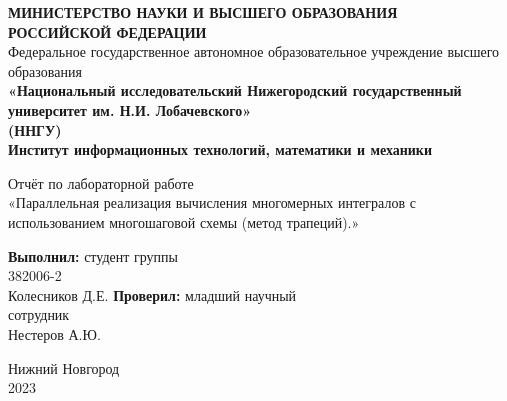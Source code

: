\documentclass[14pt, a4paper]{extarticle}
\title{}
\author{}
\date{}
\begin{document}
\begin{titlepage}
\begin{center}
{\bfseries МИНИСТЕРСТВО НАУКИ И ВЫСШЕГО ОБРАЗОВАНИЯ \\
РОССИЙСКОЙ ФЕДЕРАЦИИ}
\\
Федеральное государственное автономное образовательное учреждение высшего образования
\\
{\bfseries «Национальный исследовательский Нижегородский государственный университет им. Н.И. Лобачевского»\\(ННГУ)
\\Институт информационных технологий, математики и механики} \\
\end{center}

\vspace{8em}

\begin{center}
Отчёт по лабораторной работе \\
«Параллельная реализация вычисления многомерных интегралов с использованием многошаговой схемы (метод трапеций).»
\end{center}

\vspace{5em}


\begin{flushright}
{\bfseries Выполнил:} студент группы\\382006-2\\Колесников Д.Е. \underline{\hspace{3cm}} \linebreak\linebreak\linebreak
{\bfseries Проверил:} младший научный\\сотрудник\\Нестеров А.Ю. \underline{\hspace{3cm}} 
\end{flushright}


\vspace{\fill}

\begin{center}
Нижний Новгород\\2023
\end{center}

\end{titlepage}

\tableofcontents
\thispagestyle{empty}
\newpage


  \pagestyle{plain}
  \setcounter{page}{3}
  
\end{document}

